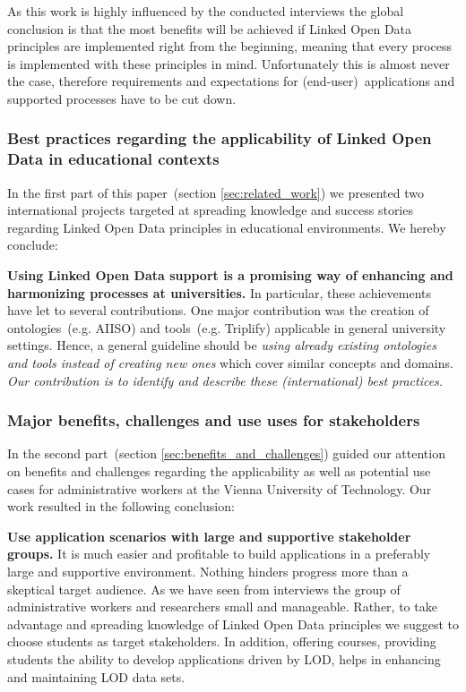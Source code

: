 \documentclass{article}
\begin{document}
As this work is highly influenced by the conducted interviews the global conclusion is that the most benefits will be achieved if Linked Open Data principles are implemented right from the beginning, meaning that every process is implemented with these principles in mind. Unfortunately this is almost never the case, therefore requirements and expectations for (end-user)~applications and supported processes have to be cut down. 

\subsubsection{Best practices regarding the applicability of Linked Open Data in educational contexts}
In the first part of this paper~(section \ref{sec:related_work}) we presented two international projects targeted at spreading knowledge and success stories regarding Linked Open Data principles in educational environments. We hereby conclude:


\textbf{Using Linked Open Data support is a promising way of enhancing and harmonizing processes at universities.}
In particular, these achievements have let to several contributions. One major contribution was the creation of ontologies~(e.g. AIISO) and tools~(e.g. Triplify) applicable in general university settings. 
Hence, a general guideline should be \textit{using already existing ontologies and tools instead of creating new ones} which cover similar concepts and domains.\\

\textit{Our contribution is to identify and describe these (international) best practices.}

\subsubsection{Major benefits, challenges and use uses for stakeholders}
In the second part~(section \ref{sec:benefits_and_challenges}) guided our attention on benefits and challenges regarding the applicability as well as
potential use cases for administrative workers at the Vienna University of Technology. 
Our work resulted in the following conclusion:

\textbf{Use application scenarios with large and supportive stakeholder groups.}
It is much easier and profitable to build applications in a preferably large and supportive environment. Nothing hinders progress more than a skeptical target audience. 
As we have seen from interviews the group of administrative workers and researchers small and manageable. Rather, to take advantage and spreading knowledge of Linked Open Data principles we suggest to choose students as target stakeholders. In addition, offering courses, providing students the ability to develop applications driven by LOD, helps in enhancing and maintaining LOD data sets. \\
\end{document}
